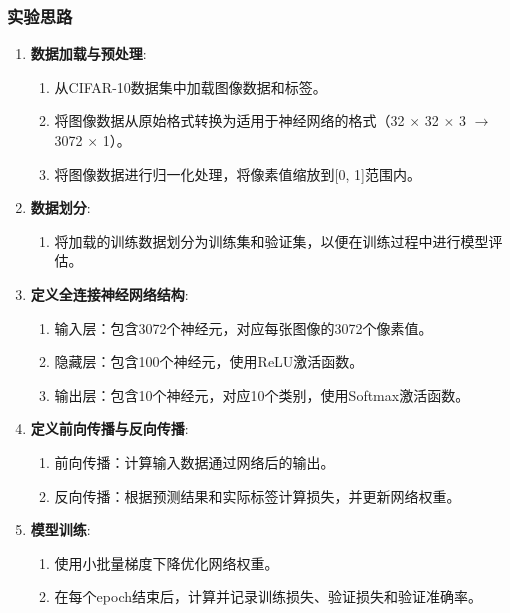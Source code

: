 \documentclass[12pt]{article}
\begin{document}
\subsubsection{实验思路}
\begin{enumerate}
  \item \textbf{数据加载与预处理}:
        \begin{enumerate}
          \item 从CIFAR-10数据集中加载图像数据和标签。
          \item 将图像数据从原始格式转换为适用于神经网络的格式（32 $\times$ 32 $\times$ 3 $\rightarrow$ 3072 $\times$ 1）。
          \item 将图像数据进行归一化处理，将像素值缩放到[0, 1]范围内。
        \end{enumerate}

  \item \textbf{数据划分}:
        \begin{enumerate}
          \item 将加载的训练数据划分为训练集和验证集，以便在训练过程中进行模型评估。
        \end{enumerate}

  \item \textbf{定义全连接神经网络结构}:
        \begin{enumerate}
          \item 输入层：包含3072个神经元，对应每张图像的3072个像素值。
          \item 隐藏层：包含100个神经元，使用ReLU激活函数。
          \item 输出层：包含10个神经元，对应10个类别，使用Softmax激活函数。
        \end{enumerate}

  \item \textbf{定义前向传播与反向传播}:
        \begin{enumerate}
          \item 前向传播：计算输入数据通过网络后的输出。
          \item 反向传播：根据预测结果和实际标签计算损失，并更新网络权重。
        \end{enumerate}

  \item \textbf{模型训练}:
        \begin{enumerate}
          \item 使用小批量梯度下降优化网络权重。
          \item 在每个epoch结束后，计算并记录训练损失、验证损失和验证准确率。
        \end{enumerate}


\end{enumerate}
\end{document}

